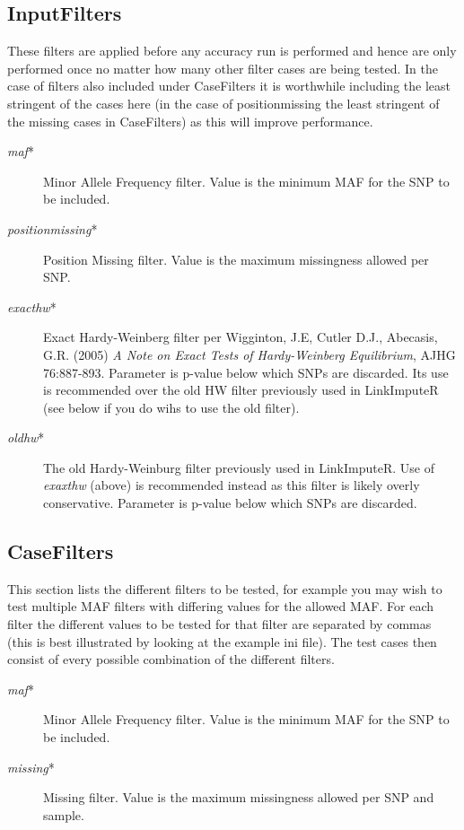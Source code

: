 \documentclass[10pt]{report}
\begin{document}
\subsection{InputFilters}
These filters are applied before any accuracy run is performed and hence are only performed once no matter how many other filter cases are being tested.  In the case of filters also included under CaseFilters it is worthwhile including the least stringent of the cases here (in the case of positionmissing the least stringent of the missing cases in CaseFilters) as this will improve performance.
\begin{description}
\item[\emph{maf}*] Minor Allele Frequency filter.  Value is the minimum MAF for the SNP to be included.
\item[\emph{positionmissing}*] Position Missing filter. Value is the maximum missingness allowed per SNP.
\item[\emph{exacthw}*] Exact Hardy-Weinberg filter per Wigginton, J.E, Cutler D.J., Abecasis, G.R. (2005) \emph{A Note on Exact Tests of Hardy-Weinberg Equilibrium}, AJHG 76:887-893.  Parameter is p-value below which SNPs are discarded.  Its use is recommended over the old HW filter previously used in LinkImputeR (see below if you do wihs to use the old filter).
\item[\emph{oldhw}*] The old Hardy-Weinburg filter previously used in LinkImputeR.  Use of \emph{exaxthw} (above) is recommended instead as this filter is likely overly conservative.  Parameter is p-value below which SNPs are discarded.
\end{description}

\subsection{CaseFilters}
This section lists the different filters to be tested, for example you may wish to test multiple MAF filters with differing values for the allowed MAF.  For each filter the different values to be tested for that filter are separated by commas (this is best illustrated by looking at the example ini file).  The test cases then consist of every possible combination of the different filters.
\begin{description}
\item[\emph{maf}*] Minor Allele Frequency filter.  Value is the minimum MAF for the SNP to be included.
\item[\emph{missing}*] Missing filter.  Value is the maximum missingness allowed per SNP and sample.
\end{description}
\end{document}
